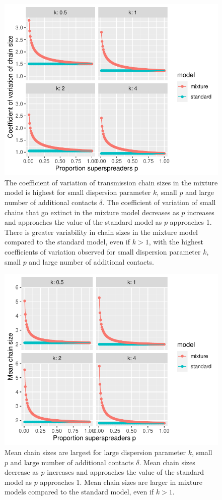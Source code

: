 \documentclass{imammb}
\numberwithin{equation}{section}
\begin{document}
{ \begin{figure}
    \centering
    \includegraphics{Figure7.pdf}
    \caption{The coefficient of variation of transmission chain sizes in the mixture model is highest for small dispersion parameter $k$, small $p$ and large number of additional contacts $\delta$. The coefficient of variation of small chains that go extinct in the mixture model decreases as $p$ increases and approaches the value of the standard model as $p$ approaches 1. There is greater variability in chain sizes in the mixture model compared to the standard model, even if $k>1$, with the highest coefficients of variation observed for small dispersion parameter $k$, small $p$ and large number of additional contacts. }
    \label{fig:CVchain}
\end{figure}

\begin{figure}
    \centering
    \includegraphics{Figure6.pdf}
    \caption{Mean chain sizes are largest for large dispersion parameter $k$, small $p$ and large number of additional contacts $\delta$. Mean chain sizes decrease as $p$ increases and approaches the value of the standard model as $p$ approaches 1. Mean chain sizes are larger in mixture models compared to the standard model, even if $k>1$. }
    \label{fig:meanchain}
\end{figure}

}
\end{document}
